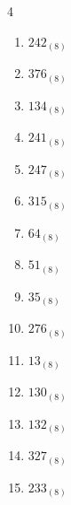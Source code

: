 \begin{multicols}{4}
\begin{enumerate}
        \phantom{$=62$}

  \item $242_{(8)}$

        \phantom{$=162$}

  \item $376_{(8)}$

        \phantom{$=254$}

  \item $134_{(8)}$

        \phantom{$=92$}

  \item $241_{(8)}$

        \phantom{$=161$}

  \item $247_{(8)}$

        \phantom{$=167$}

  \item $315_{(8)}$

        \phantom{$=205$}

  \item $64_{(8)}$

        \phantom{$=52$}

  \item $51_{(8)}$

        \phantom{$=41$}

  \item $35_{(8)}$

        \phantom{$=29$}

  \item $276_{(8)}$

        \phantom{$=190$}

  \item $13_{(8)}$

        \phantom{$=11$}

  \item $130_{(8)}$

        \phantom{$=88$}

\columnbreak %

  \item $132_{(8)}$

        \phantom{$=90$}

  \item $327_{(8)}$

        \phantom{$=215$}

  \item $233_{(8)}$

        \phantom{$=155$}


\end{enumerate}
\end{multicols}

